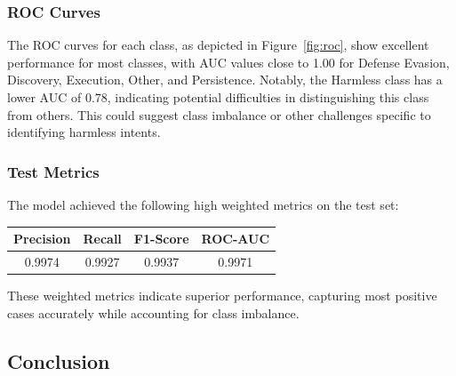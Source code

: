             \vspace{-0.2cm}

        \subsubsection{ROC Curves \\}

            The ROC curves for each class, as depicted in Figure~\ref{fig:roc}, show excellent performance for most classes, with AUC values close to 1.00 for Defense Evasion, Discovery, Execution, Other, and Persistence. Notably, the Harmless class has a lower AUC of 0.78, indicating potential difficulties in distinguishing this class from others. This could suggest class imbalance or other challenges specific to identifying harmless intents.
            
        \subsubsection{Test Metrics \\}
        
            The model achieved the following high weighted metrics on the test set:
            
            \vspace{-0.2cm}
            
            \begin{table}[h]
                \centering
                \begin{tabular}{|c|c|c|c|}
                    \hline
                    \textbf{Precision} & \textbf{Recall} & \textbf{F1-Score} & \textbf{ROC-AUC} \\
                    \hline
                    0.9974 & 0.9927 & 0.9937 & 0.9971 \\
                    \hline
                \end{tabular}
            \end{table}
            
            \vspace{-0.2cm}
            
            These weighted metrics indicate superior performance, capturing most positive cases accurately while accounting for class imbalance. 
            
    \subsection{Conclusion}

